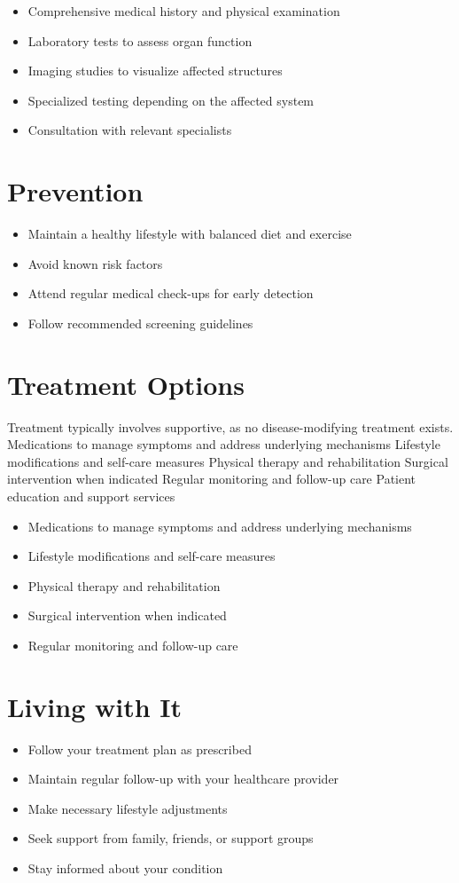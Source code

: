 \begin{itemize}[noitemsep]
  \item Comprehensive medical history and physical examination
  \item Laboratory tests to assess organ function
  \item Imaging studies to visualize affected structures
  \item Specialized testing depending on the affected system
  \item Consultation with relevant specialists
\end{itemize}
\section{Prevention}
\begin{itemize}[noitemsep]
  \item Maintain a healthy lifestyle with balanced diet and exercise
  \item Avoid known risk factors
  \item Attend regular medical check-ups for early detection
  \item Follow recommended screening guidelines
\end{itemize}
\section{Treatment Options}
Treatment typically involves supportive, as no disease-modifying treatment exists. Medications to manage symptoms and address underlying mechanisms Lifestyle modifications and self-care measures Physical therapy and rehabilitation Surgical intervention when indicated Regular monitoring and follow-up care Patient education and support services

\begin{itemize}[noitemsep]
  \item Medications to manage symptoms and address underlying mechanisms
  \item Lifestyle modifications and self-care measures
  \item Physical therapy and rehabilitation
  \item Surgical intervention when indicated
  \item Regular monitoring and follow-up care
\end{itemize}
\section{Living with It}
\begin{itemize}[noitemsep]
  \item Follow your treatment plan as prescribed
  \item Maintain regular follow-up with your healthcare provider
  \item Make necessary lifestyle adjustments
  \item Seek support from family, friends, or support groups
  \item Stay informed about your condition
\end{itemize}
